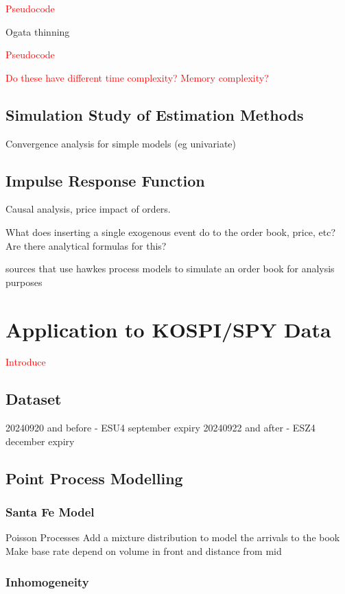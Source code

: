 \documentclass[honours,12pt]{unswthesis}
\numberwithin{equation}{section}
\begin{document}
\textcolor{red}{Pseudocode}

Ogata thinning 

\textcolor{red}{Pseudocode}

\textcolor{red}{Do these have different time complexity? Memory complexity?}

\section{Simulation Study of Estimation Methods}
Convergence analysis for simple models (eg univariate)

\section{Impulse Response Function}
Causal analysis, price impact of orders.

What does inserting a single exogenous event do to the order book, price, etc? Are there analytical formulas for this?


\cite{AbergelJedidi} \cite{Toke} sources that use hawkes process models to simulate an order book for analysis purposes


\chapter{Application to KOSPI/SPY Data} %

\textcolor{red}{Introduce}

\section{Dataset}

20240920 and before - ESU4 september expiry
20240922 and after - ESZ4 december expiry

\section{Point Process Modelling}
\subsection{Santa Fe Model}
Poisson Processes
Add a mixture distribution to model the arrivals to the book
Make base rate depend on volume in front and distance from mid
\subsection{Inhomogeneity}
\end{document}
